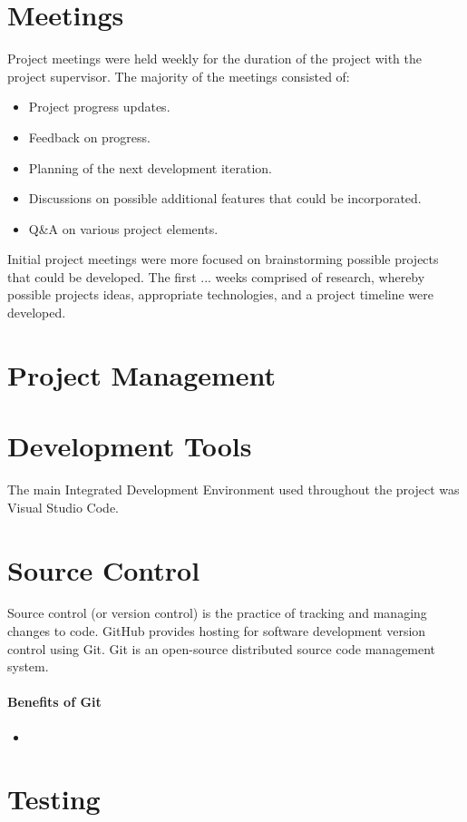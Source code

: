 \section{Meetings}
Project meetings were held weekly for the duration of the project with the project supervisor. The majority of the meetings consisted of:
\begin{itemize}
    \item Project progress updates.
    \item Feedback on progress.
    \item Planning of the next development iteration.
    \item Discussions on possible additional features that could be incorporated.
    \item Q&A on various project elements.
\end{itemize}
\par
\medskip
Initial project meetings were more focused on brainstorming possible projects that could be developed. The first ... weeks comprised of research, whereby possible projects ideas, appropriate technologies, and a project timeline were developed.

\section{Project Management}

\section{Development Tools}
The main Integrated Development Environment used throughout the project was Visual Studio Code.

\section{Source Control}
Source control (or version control) is the practice of tracking and managing changes to code. GitHub provides hosting for software development version control using Git. Git is an open-source distributed source code management system.

\paragraph{Benefits of Git}
\begin{itemize}
    \item 
\end{itemize}

\section{Testing}